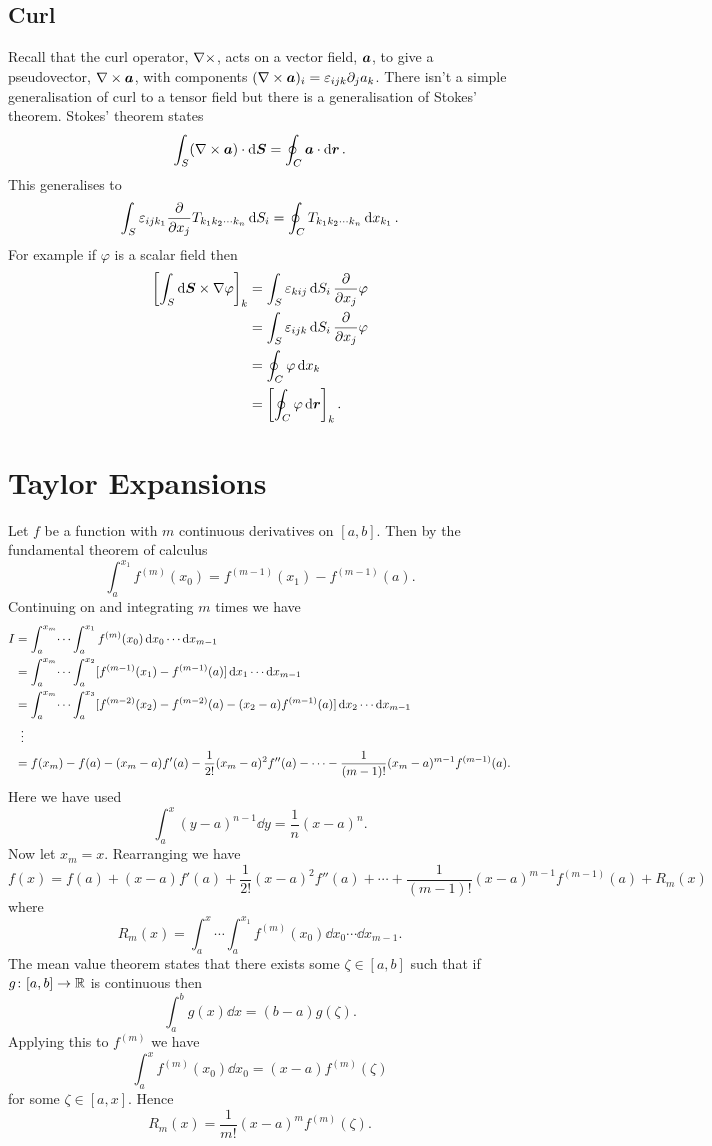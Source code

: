 \documentclass[a4paper]{article}
\newcommand{\nindices}[2]{{ {#1}_1 {#1}_2 \dotsm {#1}_{#2} }}
\begin{document}
    \subsection{Curl}
    Recall that the curl operator, \(\nabla\times\), acts on a vector field, \(\bm{a}\), to give a pseudovector, \(\nabla\times\bm{a}\), with components \((\nabla\times\bm{a})_i = \varepsilon_{ijk}\partial_ja_k\).
    There isn't a simple generalisation of curl to a tensor field but there is a generalisation of Stokes' theorem.
    Stokes' theorem states
    \[\int_S (\nabla\times\bm{a})\cdot\dd{\bm{S}} = \oint_C \bm{a}\cdot\dd{\bm{r}}.\]
    This generalises to
    \[\int_S \varepsilon_{ijk_1}\pdv{x_{j}}T_{\nindices{k}{n}}\dd{S_i} = \oint_C T_{\nindices{k}{n}}\dd{x_{k_1}}.\]
    For example if \(\varphi\) is a scalar field then
    \begin{align*}
        \left[\int_S \dd{\bm{S}} \times \nabla\varphi\right]_k &= \int_S \varepsilon_{kij}\dd{S_i}\pdv{x_j}\varphi\\
        &= \int_S \varepsilon_{ijk}\dd{S_i}\pdv{x_j}\varphi\\
        &= \oint_C \varphi \dd{x_k}\\
        &= \left[\oint_C \varphi \dd{\bm{r}}\right]_k.
    \end{align*}
    
    \section{Taylor Expansions}
    Let \(f\) be a function with \(m\) continuous derivatives on \([a, b]\).
    Then by the fundamental theorem of calculus
    \[\int_a^{x_1}f^{(m)}(x_0) = f^{(m-1)}(x_1) - f^{(m-1)}(a).\]
    Continuing on and integrating \(m\) times we have
    \begin{align*}
        I &= \int_{a}^{x_m} \dotsi \int_{a}^{x_1} f^{(m)}(x_0)\dd{x_0}\dotsm\dd{x_{m-1}}\\
        &= \int_{a}^{x_m} \dotsi \int_{a}^{x_2} [f^{(m-1)}(x_1) - f^{(m-1)}(a)]\dd{x_1}\dotsm\dd{x_{m-1}}\\
        &= \int_{a}^{x_m} \dotsi \int_{a}^{x_3} [f^{(m-2)}(x_2) - f^{(m-2)}(a) - (x_2 - a)f^{(m-1)}(a)] \dd{x_2}\dotsm\dd{x_{m-1}}\\
        &\hspace{0.5em}\vdots\\
        &= f(x_m) - f(a) - (x_m - a)f'(a) - \frac{1}{2!}(x_m - a)^2f''(a) - \dotsb - \frac{1}{(m - 1)!}(x_m - a)^{m-1}f^{(m-1)}(a).
    \end{align*}
    Here we have used
    \[\int_a^x (y - a)^{n-1} \dd{y} = \frac{1}{n}(x - a)^n.\]
    Now let \(x_m = x\).
    Rearranging we have
    \[f(x) = f(a) + (x - a)f'(a) + \frac{1}{2!}(x - a)^2f''(a) + \dotsb + \frac{1}{(m - 1)!}(x - a)^{m - 1}f^{(m - 1)}(a) + R_m(x)\]
    where
    \[R_m(x) = \int_a^x\dotsi\int_a^{x_1} f^{(m)}(x_0)\dd{x_0}\dotsm\dd{x_{m-1}}.\]
    The mean value theorem states that there exists some \(\zeta\in[a, b]\) such that if \(g\colon[a, b]\to\mathbb{R}\) is continuous then
    \[\int_a^b g(x)\dd{x} = (b - a)g(\zeta).\]
    Applying this to \(f^{(m)}\) we have
    \[\int_a^x f^{(m)}(x_0) \dd{x_0} = (x - a)f^{(m)}(\zeta)\]
    for some \(\zeta\in[a, x]\).
    Hence
    \[R_m(x) = \frac{1}{m!}(x - a)^mf^{(m)}(\zeta).\]
    
\end{document}
